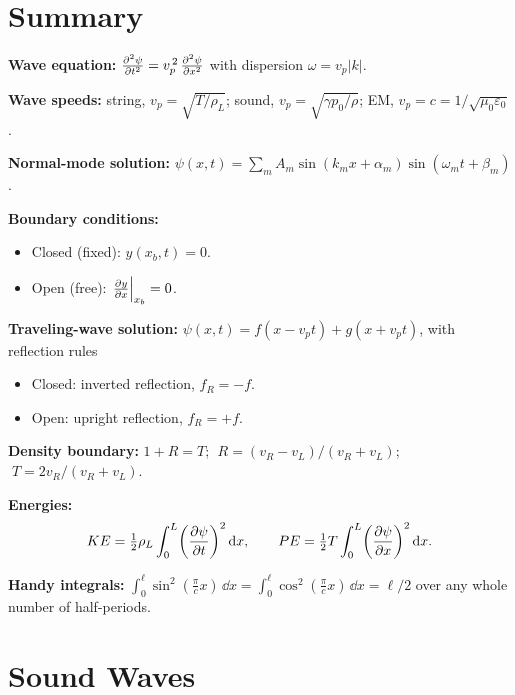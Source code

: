 \section{Summary}

\begin{fact}\hfill

\textbf{Wave equation:} $\pdv[2]{\psi}{t} = v_p^{\,2}\,\pdv[2]{\psi}{x}$ with dispersion $\omega = v_p |k|$.

\textbf{Wave speeds:} string, $v_p = \sqrt{T/\rho_L}$; sound, $v_p = \sqrt{\gamma p_0/\rho}$; EM, $v_p = c = 1/\sqrt{\mu_0\varepsilon_0}$.

\textbf{Normal-mode solution:} $\psi(x,t) = \sum_m A_m \sin(k_m x + \alpha_m)\sin(\omega_m t + \beta_m)$.

\textbf{Boundary conditions:}
\begin{itemize}
    \item Closed (fixed): $y(x_b, t) = 0$.
    \item Open (free): $\left.\pdv{y}{x}\right|_{x_b} = 0$.
\end{itemize}

\textbf{Traveling-wave solution:} $\psi(x, t) = f(x - v_p t) + g(x + v_p t)$, with reflection rules
\begin{itemize}
    \item Closed: inverted reflection, $f_R = -f$.
    \item Open: upright reflection, $f_R = +f$.
\end{itemize}

\textbf{Density boundary:} $1 + R = T$; $\;R = (v_R - v_L)/(v_R + v_L)$; $\;T = 2 v_R/(v_R + v_L)$.

\textbf{Energies:}
\begin{equation*}
    KE = \tfrac{1}{2}\rho_L \int_0^L \!\left(\pdv{\psi}{t}\right)^2 \dd x, \qquad PE = \tfrac{1}{2}T\int_0^L \!\left(\pdv{\psi}{x}\right)^2 \dd x.
\end{equation*}

\textbf{Handy integrals:} $\int_0^\ell \sin^2(\tfrac{\pi}{c}x)\,\dd x = \int_0^\ell \cos^2(\tfrac{\pi}{c}x)\,\dd x = \ell/2$ over any whole number of half-periods.
\end{fact}

\section{Sound Waves}

